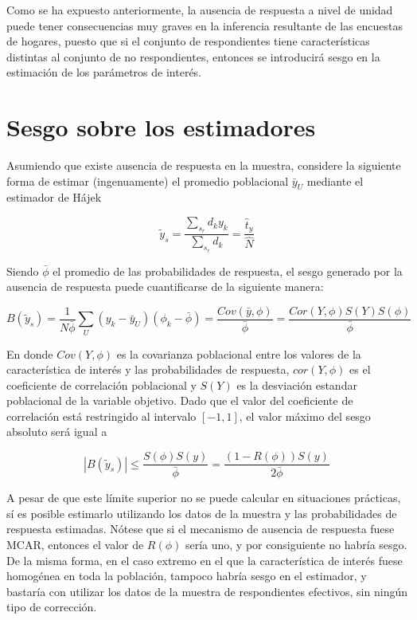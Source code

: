 \documentclass[
  12pt,
]{book}
\begin{document}
Como se ha expuesto anteriormente, la ausencia de respuesta a nivel de unidad puede tener consecuencias muy graves en la inferencia resultante de las encuestas de hogares, puesto que si el conjunto de respondientes tiene características distintas al conjunto de no respondientes, entonces se introducirá sesgo en la estimación de los parámetros de interés.

\hypertarget{sesgo-sobre-los-estimadores}{%
\section{Sesgo sobre los estimadores}\label{sesgo-sobre-los-estimadores}}

Asumiendo que existe ausencia de respuesta en la muestra, considere la siguiente forma de estimar (ingenuamente) el promedio poblacional \(\bar{y}_U\) mediante el estimador de Hájek

\[
\tilde{y}_s = \frac{\sum_{s_r}d_ky_k}{\sum_{s_r}d_k} = \frac{\hat{t}_y}{\hat{N}}
\]

Siendo \(\bar{\phi}\) el promedio de las probabilidades de respuesta, el sesgo generado por la ausencia de respuesta puede cuantificarse de la siguiente manera:

\[
B\left(\tilde{y}_s\right)  = 
\frac{1}{N\bar{\phi}}\sum_U(y_k-\bar{y}_U)(\phi_k-\bar{\phi})
= \frac{Cov\left(\bar{y},\phi\right)}{\bar{\phi}}
= \frac{Cor\left(Y,\phi\right)S\left(Y\right)S\left(\phi\right)}{\bar{\phi}}
\]

En donde \(Cov\left(Y,\phi\right)\) es la covarianza poblacional entre
los valores de la característica de interés y las probabilidades de respuesta,
\(cor\left(Y,\phi\right)\) es el coeficiente de correlación poblacional
y \(S\left(Y\right)\) es la desviación estandar poblacional de la variable objetivo. Dado que el valor del coeficiente de correlación está restringido
al intervalo \([-1, 1]\), el valor máximo del sesgo absoluto será igual a

\[
|B\left(\tilde{y}_s\right)| \leq 
\frac{S\left(\phi\right)S\left(y\right)}{\bar{\phi}}
= \frac{\left(1-R\left(\phi\right)\right)S\left(y\right)}{2\bar{\phi}}
\]

A pesar de que este límite superior no se puede calcular en situaciones prácticas, sí es posible estimarlo utilizando los datos de la muestra y las probabilidades
de respuesta estimadas. Nótese que si el mecanismo de ausencia de respuesta fuese MCAR, entonces el valor de \(R\left(\phi\right)\) sería uno, y por consiguiente no habría sesgo. De la misma forma, en el caso extremo en el que la característica de interés fuese homogénea en toda la población, tampoco habría sesgo en el estimador, y bastaría con utilizar los datos de la muestra de respondientes efectivos, sin ningún tipo de corrección.
\end{document}
